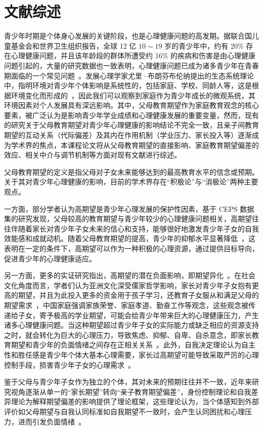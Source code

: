 \documentclass[zihao = -4, linespread = 1.5]{article}
\begin{document}
\section{文献综述}
青少年时期是个体身心发展的关键阶段，也是心理健康问题的高发期。据联合国儿童基金会和世界卫生组织报告，全球 12 亿 $10\sim19$ 岁的青少年中，约有 20\% 存在心理健康问题，并且该年龄段的群体所遭受约 16\% 的疾病和伤害是由心理健康问题引起的，大量的研究数据也一致表明，心理健康问题已成为诸多青少年在青春期面临的一个常见问题~\citep{CEPS}。发展心理学家尤里·布朗芬布伦纳提出的生态系统理论中，指明环境对青少年个体影响是系统性的，包括家庭、学校、同龄人等，这是根据环境变化而形成的~\citep{Bronfenbrenner}，因此我们可以观察到家庭作为青少年成长的微观系统，其环境因素对个人发展具有深远影响。其中，父母教育期望作为家庭教育观念的核心要素，被广泛认为是影响青少年学业成绩和心理健康发展的重要变量，然而，现有的研究关于父母教育期望对青少年心理健康的影响结论不完全一致，且亲子间教育期望的互动关系（代际偏差）及其内在作用机制（学业压力、家长投入等）逐渐成为学术界的焦点，本课程论文将从父母教育期望的直接影响、家庭教育期望偏差的效应、相关中介与调节机制等方面对现有文献进行综述。

父母教育期望的定义是指父母对子女未来能够达到的最高教育水平的信念或预期。关于其对青少年心理健康的影响，目前的学术界存在“积极论”与“消极论”两种主要观点。

一方面，部分学者认为高期望是青少年心理发展的保护性因素，基于 CEPS 数据集的研究发现，父母较高的教育期望与青少年较少的心理健康问题相关，高期望往往伴随着家长对青少年子女未来的信心和支持，能够很好地激发青少年子女的自我效能感和成就动机。随着父母教育期望的提高，青少年的抑郁水平显著降低~\citep{Resnick}，这表明在一定的条件下，高期望可以作为一种积极的心理资源，通过提供目标导向，促进青少年的心理健康适应。

另一方面，更多的实证研究指出，高期望的潜在负面影响，即期望异化~\citep{MaBianJing}。在社会文化角度而言，学者们认为亚洲文化深受儒家哲学影响，家长对青少年子女抱有更高的期望，并且为此投入更多的资金用于孩子学习，还教育子女服从和满足父母的期望需求~\citep{Cultural}，中国家庭强调家族荣誉、家庭孝道、勤奋工作等观念，这些观念被传递给子女，寄予极高的学业期望，可能会给青少年带来巨大的心理健康压力，产生诸多心理健康问题。当这种期望超过青少年子女的实际能力或缺乏相应的资源支持之时，就会转化为巨大的心理压力，导致焦虑、抑郁、自卑、自杀意念，即家长教育期望和青少年的负面情绪之间存在正相关关系~\citep{Role}。此外，自我决定理论认为自主性和胜任感是青少年个体大基本心理需要，家长过高期望可能导致采取严厉的心理控制手段，损害青少年子女的心理需求~\citep{LiDaLin}。

鉴于父母与青少年子女作为独立的个体，其对未来的预期往往并不一致，近年来研究视角逐渐从单一的“家长期望”转向“亲子教育期望偏差”，身份控制理论和自我差异理论为解释期望偏差的影响提供了理论框架，这些理论认为，当个体感知到外部评价如父母期望与自我认同标准如自我期望不一致时，会产生认同困扰和心理压力，进而引发负面情绪~\citep{Higgins}。
\end{document}
